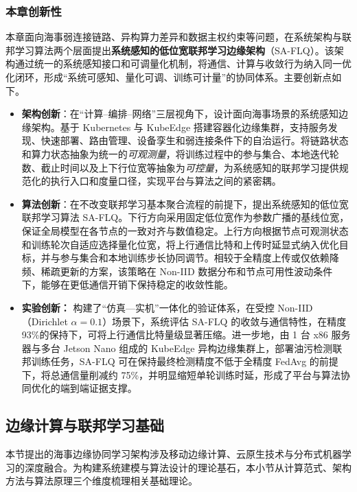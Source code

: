 \subsubsection{本章创新性}
本章面向海事弱连接链路、异构算力差异和数据主权约束等问题，在系统架构与联邦学习算法两个层面提出\textbf{系统感知的低位宽联邦学习边缘架构}（SA-FLQ）。该架构通过统一的系统感知接口和可调量化机制，将通信、计算与收敛行为纳入同一优化闭环，形成“系统可感知、量化可调、训练可计量”的协同体系。主要创新点如下。

\begin{itemize}
	\item \textbf{架构创新}：在“计算–编排–网络”三层视角下，设计面向海事场景的系统感知边缘架构。基于 Kubernetes 与 KubeEdge 搭建容器化边缘集群，支持服务发现、快速部署、路由管理、设备孪生和弱连接条件下的自治运行。将链路状态和算力状态抽象为统一的\emph{可观测量}，将训练过程中的参与集合、本地迭代轮数、截止时间以及上下行位宽等抽象为\emph{可控量}，为系统感知的联邦学习提供规范化的执行入口和度量口径，实现平台与算法之间的紧密耦。
		
	\item \textbf{算法创新}：在不改变联邦学习基本聚合流程的前提下，提出系统感知的低位宽联邦学习算法 SA-FLQ。下行方向采用固定低位宽作为参数广播的基线位宽，保证全局模型在各节点的一致对齐与数值稳定。上行方向根据节点可观测状态和训练轮次自适应选择量化位宽，将上行通信比特和上传时延显式纳入优化目标，并与参与集合和本地训练步长协同调节。相较于全精度上传或仅依赖降频、稀疏更新的方案，该策略在 Non-IID 数据分布和节点可用性波动条件下，能够在更低通信开销下保持稳定的收敛性能。
	
	\item \textbf{实验创新：} 构建了“仿真—实机”一体化的验证体系，在受控 Non-IID（Dirichlet $\alpha=0.1$）场景下，系统评估 SA\mbox{-}FLQ 的收敛与通信特性，在精度93\%的保持下，可将上行通信比特量级显著压缩。进一步地，由 1 台 x86 服务器与多台 Jetson Nano 组成的 KubeEdge 异构边缘集群上，部署油污检测联邦训练任务，SA\mbox{-}FLQ 可在保持最终检测精度不低于全精度 FedAvg 的前提下，将总通信量削减约 75\%，并明显缩短单轮训练时延，形成了平台与算法协同优化的端到端证据支撑。
\end{itemize}

\subsection{边缘计算与联邦学习基础}
\label{sec:preliminaries}
本节提出的海事边缘协同学习架构涉及移动边缘计算、云原生技术与分布式机器学习的深度融合。为构建系统建模与算法设计的理论基石，本小节从计算范式、架构方法与算法原理三个维度梳理相关基础理论。

